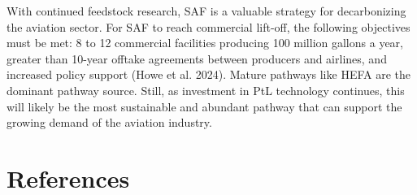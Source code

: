 \documentclass[12pt]{article}
\begin{document}
With continued feedstock research, SAF is a valuable strategy for decarbonizing the aviation sector. For SAF to reach commercial lift-off, the following objectives must be met: 8 to 12 commercial facilities producing 100 million gallons a year, greater than 10-year offtake agreements between producers and airlines, and increased policy support (Howe et al. 2024). Mature pathways like HEFA are the dominant pathway source. Still, as investment in PtL technology continues, this will likely be the most sustainable and abundant pathway that can support the growing demand of the aviation industry.












\clearpage
\section{References}
\end{document}
